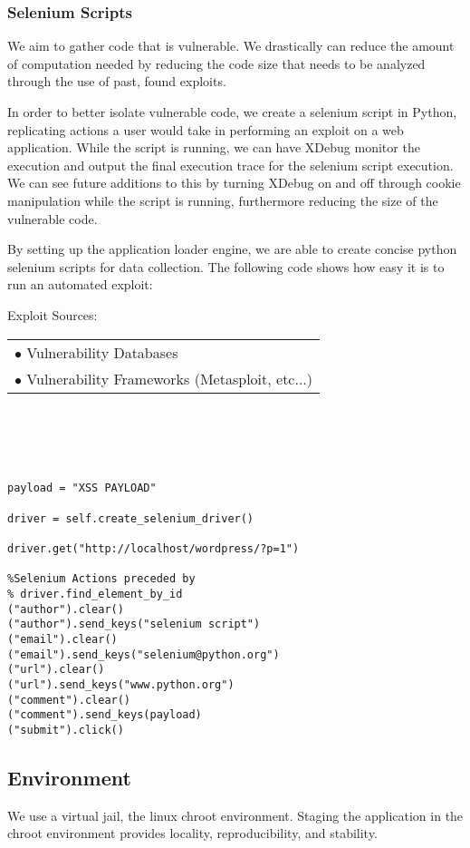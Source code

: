 \documentclass[letterpaper,twocolumn,10pt]{article}
\begin{document}
\subsubsection{Selenium Scripts}
We aim to gather code that is vulnerable.  We drastically can reduce the amount of computation needed by reducing the code size that needs to be analyzed through the use of past, found exploits.  

In order to better isolate vulnerable code, we create a selenium script in Python, replicating actions a user would take in performing an exploit on a web application.  While the script is running, we can have XDebug monitor the execution and output the final execution trace for the selenium script execution.  We can see future additions to this by turning XDebug on and off through cookie manipulation while the script is running, furthermore reducing the size of the vulnerable code.

By setting up the application loader engine, we are able to create concise python selenium scripts for data collection.  The following code shows how easy it is to run an automated exploit:

Exploit Sources:\\
 \begin{tabular} { l }
   $\bullet$ Vulnerability Databases\\
   $\bullet$ Vulnerability Frameworks (Metasploit, etc...)\\
 \end{tabular}
\\

{\tt \footnotesize
\begin{verbatim}

payload = "XSS PAYLOAD"

driver = self.create_selenium_driver()

driver.get("http://localhost/wordpress/?p=1")

%Selenium Actions preceded by
% driver.find_element_by_id
("author").clear()
("author").send_keys("selenium script")
("email").clear()
("email").send_keys("selenium@python.org")
("url").clear()
("url").send_keys("www.python.org")
("comment").clear()
("comment").send_keys(payload)
("submit").click()

\end{verbatim}}

\subsection{Environment}
We use a virtual jail, the linux chroot environment.  Staging the application in the chroot environment provides locality, reproducibility, and stability.  
\end{document}
